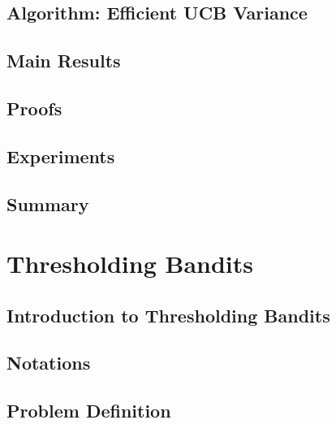 \documentclass[MS]{iitmdiss}
\begin{document}
\section{Algorithm: Efficient UCB Variance}
\label{sec:eucbv}


\section{Main Results} 
\label{sec:results}


\section{Proofs}
\label{sec:proofTheorem}


\section{Experiments}
\label{sec:expt}


\section{Summary}
\label{sec:conc}











\chapter{Thresholding Bandits}
\label{chap:tbandit1}

\section{Introduction to Thresholding Bandits}
\label{tbandit:intro1}


\section{Notations}
\label{tbandit:notations}


\section{Problem Definition}
\label{tbandit:probDef}

\end{document}
